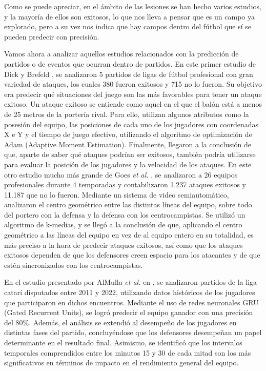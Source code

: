 Como se puede apreciar, en el ámbito de las lesiones se han hecho varios estudios, y la mayoría de ellos son exitosos, lo que nos lleva a pensar que es un campo ya explorado, pero a su vez nos indica que hay campos dentro del fútbol que sí se pueden predecir con precisión.

Vamos ahora a analizar aquellos estudios relacionados con la predicción de partidos o de eventos que ocurran dentro de partidos. En este primer estudio de Dick y Brefeld \cite{first-outcome}, se analizaron 5 partidos de ligas de fútbol profesional con gran variedad de ataques, los cuales 380 fueron exitosos y 715 no lo fueron. Su objetivo era predecir qué situaciones del juego son las más favorables para tener un ataque exitoso. Un ataque exitoso se entiende como aquel en el que el balón está a menos de 25 metros de la portería rival. Para ello, utilizan algunos atributos como la posesión del equipo, las posiciones de cada uno de los jugadores con coordenadas X e Y y el tiempo de juego efectivo, utilizando el algoritmo de optimización de Adam (Adaptive Moment Estimation). Finalmente, llegaron a la conclusión de que, aparte de saber qué ataques podrían ser exitosos, también podría utilizarse para evaluar la posición de los jugadores y la velocidad de los ataques. En este otro estudio mucho más grande de Goes \textit{et al.} \cite{second-outcome}, se analizaron a 26 equipos profesionales durante 4 temporadas y contabilizaron 1.237 ataques exitosos y 11.187 que no lo fueron. Mediante un sistema de video semiautomático, analizaron el centro geométrico entre las distintas líneas del equipo, sobre todo del portero con la defensa y la defensa con los centrocampistas. Se utilizó un algoritmo de k-medias, y se llegó a la conclusión de que, aplicando el centro geométrico a las líneas del equipo en vez de al equipo entero en su totalidad, es más preciso a la hora de predecir ataques exitosos, así como que los ataques exitosos dependen de que los defensores creen espacio para los atacantes y de que estén sincronizados con los centrocampistas.

En el estudio presentado por AlMulla \textit{et al.} en \cite{third-outcome}, se analizaron partidos de la liga catarí disputados entre 2011 y 2022, utilizando datos históricos de los jugadores que participaron en dichos encuentros. Mediante el uso de redes neuronales GRU (Gated Recurrent Units), se logró predecir el equipo ganador con una precisión del 80\%. Además, el análisis se extendió al desempeño de los jugadores en distintas fases del partido, concluyéndose que los defensores desempeñan un papel determinante en el resultado final. Asimismo, se identificó que los intervalos temporales comprendidos entre los minutos 15 y 30 de cada mitad son los más significativos en términos de impacto en el rendimiento general del equipo.

